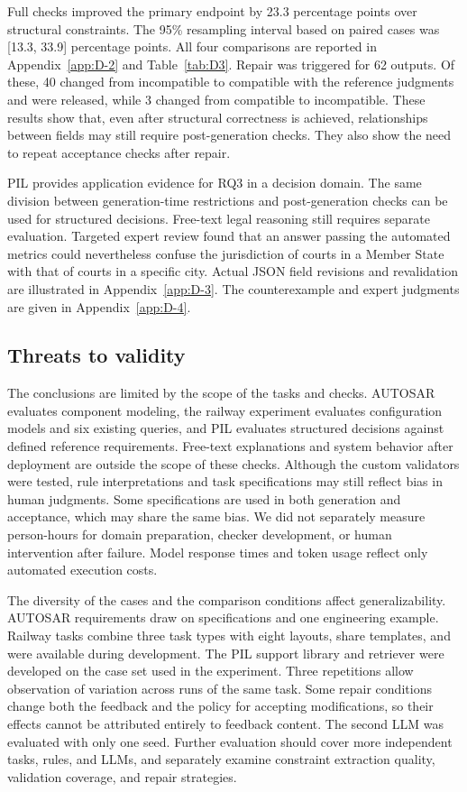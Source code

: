 \documentclass[pdflatex,iicol,sn-mathphys-num]{sn-jnl}
\begin{document}
Full checks improved the primary endpoint by 23.3 percentage points over structural constraints. The 95\% resampling interval based on paired cases was [13.3, 33.9] percentage points. All four comparisons are reported in Appendix~\ref{app:D-2} and Table~\ref{tab:D3}. Repair was triggered for 62 outputs. Of these, 40 changed from incompatible to compatible with the reference judgments and were released, while 3 changed from compatible to incompatible. These results show that, even after structural correctness is achieved, relationships between fields may still require post-generation checks. They also show the need to repeat acceptance checks after repair.


PIL provides application evidence for RQ3 in a decision domain. The same division between generation-time restrictions and post-generation checks can be used for structured decisions. Free-text legal reasoning still requires separate evaluation. Targeted expert review found that an answer passing the automated metrics could nevertheless confuse the jurisdiction of courts in a Member State with that of courts in a specific city. Actual JSON field revisions and revalidation are illustrated in Appendix~\ref{app:D-3}. The counterexample and expert judgments are given in Appendix~\ref{app:D-4}.


\subsection{Threats to validity}\label{sec:eval-4-6}

The conclusions are limited by the scope of the tasks and checks. AUTOSAR evaluates component modeling, the railway experiment evaluates configuration models and six existing queries, and PIL evaluates structured decisions against defined reference requirements. Free-text explanations and system behavior after deployment are outside the scope of these checks. Although the custom validators were tested, rule interpretations and task specifications may still reflect bias in human judgments. Some specifications are used in both generation and acceptance, which may share the same bias. We did not separately measure person-hours for domain preparation, checker development, or human intervention after failure. Model response times and token usage reflect only automated execution costs.


The diversity of the cases and the comparison conditions affect generalizability. AUTOSAR requirements draw on specifications and one engineering example. Railway tasks combine three task types with eight layouts, share templates, and were available during development. The PIL support library and retriever were developed on the case set used in the experiment. Three repetitions allow observation of variation across runs of the same task. Some repair conditions change both the feedback and the policy for accepting modifications, so their effects cannot be attributed entirely to feedback content. The second LLM was evaluated with only one seed. Further evaluation should cover more independent tasks, rules, and LLMs, and separately examine constraint extraction quality, validation coverage, and repair strategies.
\end{document}
